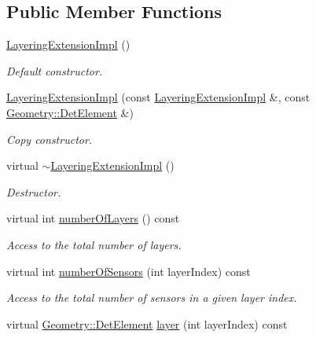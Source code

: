 \subsection*{Public Member Functions}
\begin{DoxyCompactItemize}
\item 
\hyperlink{class_d_d4hep_1_1_d_d_rec_1_1_layering_extension_impl_a870512f3f48cb5ad014fbe822a50be67}{Layering\+Extension\+Impl} ()
\begin{DoxyCompactList}\small\item\em Default constructor. \end{DoxyCompactList}\item 
\hyperlink{class_d_d4hep_1_1_d_d_rec_1_1_layering_extension_impl_aa8410cb9758c1ab2aeaa4a02478c3ed0}{Layering\+Extension\+Impl} (const \hyperlink{class_d_d4hep_1_1_d_d_rec_1_1_layering_extension_impl}{Layering\+Extension\+Impl} \&, const \hyperlink{class_d_d4hep_1_1_geometry_1_1_det_element}{Geometry\+::\+Det\+Element} \&)
\begin{DoxyCompactList}\small\item\em Copy constructor. \end{DoxyCompactList}\item 
virtual \hyperlink{class_d_d4hep_1_1_d_d_rec_1_1_layering_extension_impl_a12c9038ed17e445cf503abb692e87657}{$\sim$\+Layering\+Extension\+Impl} ()
\begin{DoxyCompactList}\small\item\em Destructor. \end{DoxyCompactList}\item 
virtual int \hyperlink{class_d_d4hep_1_1_d_d_rec_1_1_layering_extension_impl_aa0489a7a78bd134ff3ecdf2509c3c1c0}{number\+Of\+Layers} () const
\begin{DoxyCompactList}\small\item\em Access to the total number of layers. \end{DoxyCompactList}\item 
virtual int \hyperlink{class_d_d4hep_1_1_d_d_rec_1_1_layering_extension_impl_a6d5c1cd2069a0af86944ea4aa55357a8}{number\+Of\+Sensors} (int layer\+Index) const
\begin{DoxyCompactList}\small\item\em Access to the total number of sensors in a given layer index. \end{DoxyCompactList}\item 
virtual \hyperlink{class_d_d4hep_1_1_geometry_1_1_det_element}{Geometry\+::\+Det\+Element} \hyperlink{class_d_d4hep_1_1_d_d_rec_1_1_layering_extension_impl_a8bedbd77b80001351451a8cf3bba6a5c}{layer} (int layer\+Index) const

\end{DoxyCompactItemize}

